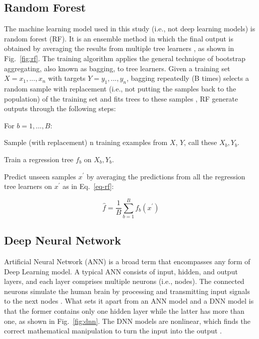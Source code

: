 \subsection{Random Forest}
The machine learning model used in this study (i.e., not deep learning models) is random forest (RF). It is an ensemble method in which the final output is obtained by averaging the results from multiple tree learners \citep{wangMachineLearningFramework2021}, as shown in Fig.~\ref{fig:rf}. The training algorithm applies the general technique of bootstrap aggregating, also known as bagging, to tree learners. Given a training set $X = x_1, ..., x_n$ with targets $Y = y_1, ..., y_n$, bagging repeatedly (B times) selects a random sample with replacement (i.e., not putting the samples back to the population) of the training set and fits trees to these samples \citep{wikipediaRandomForest2022}, RF generate outputs through the following steps:

For $b=1, ..., B:$

\noindent
\begin{myenumerate}
  \item Sample (with replacement) n training examples from $X$, $Y$, call these $X_b, Y_b$.
  \item Train a regression tree $f_b$ on $X_b, Y_b$.
  \item Predict unseen samples $x^{'}$ by averaging the predictions from all the regression tree learners on $x^{'}$ as in Eq.~\ref{eq-rf}:
\end{myenumerate}

\begin{equation}\label{eq-rf}
  \hat{f}=\frac{1}{B}\sum_{b=1}^{B}f_b(x^{'})
\end{equation}

\subsection{Deep Neural Network}
Artificial Neural Network (ANN) is a broad term that encompasses any form of Deep Learning model. A typical ANN consists of input, hidden, and output layers, and each layer comprises multiple neurons (i.e., nodes). The connected neurons simulate the human brain by processing and transmitting input signals to the next nodes \citep{mohseni-dargahChapter12Machine2022}. What sets it apart from an ANN model and a DNN model is that the former contains only one hidden layer while the latter has more than one, as shown in Fig.~\ref{fig:dnn}. The DNN models are nonlinear, which finds the correct mathematical manipulation to turn the input into the output \citep{bangaloreaiDeepNeuralNetwork2018}.

